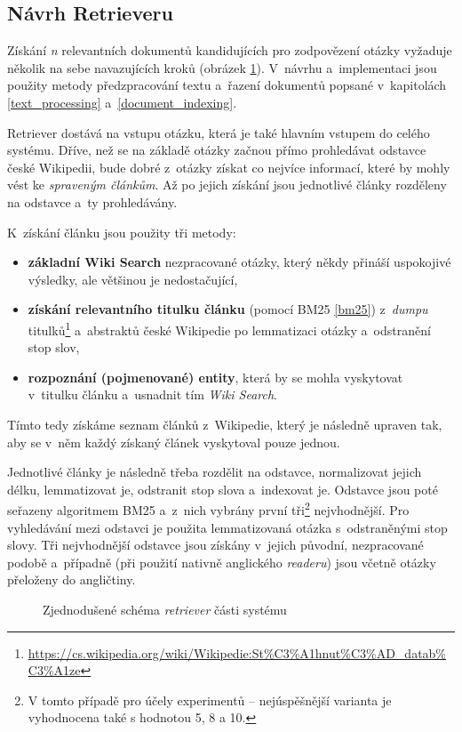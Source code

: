 \subsection{Návrh Retrieveru}
Získání \emph{n} relevantních dokumentů kandidujících pro zodpovězení otázky vyžaduje několik na sebe navazujících kroků (obrázek \ref{retriever-simple-scheme}). V~návrhu a~implementaci jsou použity metody předzpracování textu a~řazení dokumentů popsané v~kapitolách \ref{text_processing} a~\ref{document_indexing}.\par
Retriever dostává na vstupu otázku, která je také hlavním vstupem do celého systému. Dříve, než se na základě otázky začnou přímo prohledávat odstavce české Wikipedii, bude dobré z~otázky získat co nejvíce informací, které by mohly vést ke \emph{spraveným článkům}. Až po jejich získání jsou jednotlivé články rozděleny na odstavce a~ty prohledávány.\par
\noindent K~získání článku jsou použity tři metody:
\begin{itemize}
    \item \textbf{základní Wiki Search} nezpracované otázky, který někdy přináší uspokojivé výsledky, ale většinou je nedostačující,
    \item \textbf{získání relevantního titulku článku} (pomocí BM25 \ref{bm25}) z~\emph{dumpu} titulků\footnote{\url{https://cs.wikipedia.org/wiki/Wikipedie:St\%C3\%A1hnut\%C3\%AD_datab\%C3\%A1ze}} a~abstraktů české Wikipedie po lemmatizaci otázky a~odstranění stop slov,
    \item \textbf{rozpoznání (pojmenované) entity}, která by se mohla vyskytovat v~titulku článku a~usnadnit tím \emph{Wiki Search}.
\end{itemize}
Tímto tedy získáme seznam článků z~Wikipedie, který je následně upraven tak, aby se v~něm každý získaný článek vyskytoval pouze jednou.\par
Jednotlivé články je následně třeba rozdělit na odstavce, normalizovat jejich délku, lemmatizovat je, odstranit stop slova a~indexovat je. Odstavce jsou poté seřazeny algoritmem BM25 a~z~nich vybrány první tři\footnote{V tomto případě pro účely experimentů -- nejúspěšnější varianta je vyhodnocena také s hodnotou 5, 8 a 10.} nejvhodnější. Pro vyhledávání mezi odstavci je použita lemmatizovaná otázka s~odstraněnými stop slovy. Tři nejvhodnější odstavce jsou získány v~jejich původní, nezpracované podobě a~případně (při použití nativně anglického \emph{readeru}) jsou včetně otázky přeloženy do angličtiny.

\begin{figure}[hbt]
	\centering
	\caption{Zjednodušené schéma \emph{retriever} části systému}
	\label{retriever-simple-scheme}
\end{figure}

